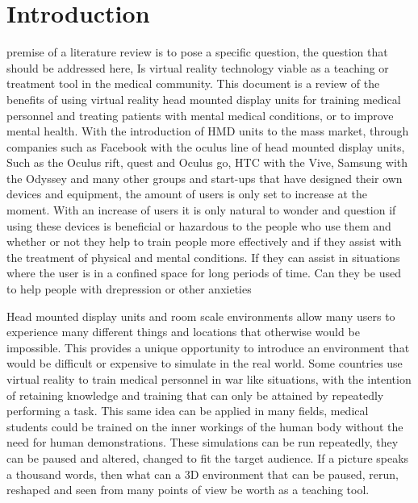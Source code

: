 \documentclass[10pt,journal,compsoc]{IEEEtran}
\begin{document}
	\section{Introduction}
	 premise of a literature review is to pose a specific question, the question that should be addressed here, Is virtual reality technology viable as a teaching or treatment tool in the medical community. This document is a review of the benefits of using virtual reality head mounted display units for training medical personnel and treating patients with mental medical conditions, or to improve mental health. With the introduction of HMD units to the mass market, through companies such as Facebook with the oculus line of head mounted display units, Such as the Oculus rift, quest and Oculus go, HTC with the Vive, Samsung with the Odyssey and many other groups and start-ups that have designed their own devices and equipment, the amount of users is only set to increase at the moment. With an increase of users it is only natural to wonder and question if using these devices is beneficial or hazardous to the people who use them and whether or not they help to train people more effectively and if they assist with the treatment of physical and mental conditions. If they can assist in situations where the user is in a confined space for long periods of time. Can they be used to help people with drepression or other anxieties \newline
	
	Head mounted display units and room scale environments allow many users to experience many different things and locations that otherwise would be impossible. This provides a unique opportunity to introduce an environment that would be difficult or expensive to simulate in the real world. Some countries use virtual reality to train medical personnel in war like situations, with the intention of retaining knowledge and training that can only be attained by repeatedly performing a task. This same idea can be applied in many fields,  medical students could be trained on the inner workings of the human body without the need for human demonstrations. These simulations can be run repeatedly, they can be paused and altered, changed to fit the target audience. If a picture speaks a thousand words, then what can a 3D environment that can be paused, rerun, reshaped and seen from many points of view be worth as a teaching tool.
	\newline
		
\end{document}
